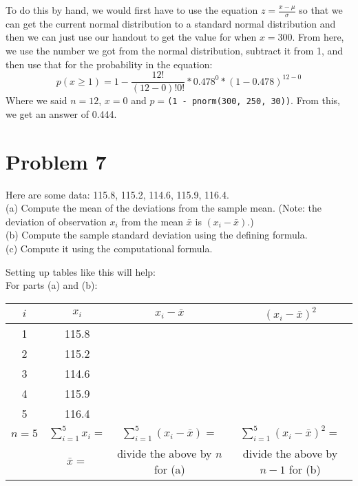 \documentclass{article}
\newcommand{\code}[1]{\texttt{#1}}
\begin{document}
	To do this by hand, we would first have to use the equation $z = \frac{x-\mu}{\sigma}$ so that we can get the current normal distribution to a standard normal distribution and then we can just use our handout to get the value for when $x = 300$. From here, we use the number we got from the normal distribution, subtract it from 1, and then use that for the probability in the equation:
	\begin{displaymath}
		p(x \ge 1) = 1 - \frac{12!}{(12-0)!0!}*0.478^0*(1-0.478)^{12-0}
	\end{displaymath}
	Where we said $n = 12$, $x = 0$ and $p=$\code{(1 - pnorm(300, 250, 30))}. From this, we get an answer of 0.444. %


\section*{Problem 7}

	Here are some data: 115.8, 115.2, 114.6, 115.9, 116.4. \\

	(a) Compute the mean of the deviations from the sample mean. (Note: the deviation of 
	observation $x_i$ from the mean $\bar{x}$ is $(x_i - \bar{x})$.) \\
	(b) Compute the sample standard deviation using the defining formula. \\
	(c) Compute it using the computational formula.
	
	Setting up tables like this will help: \\
	
	For parts (a) and (b):
	\begin{table}[!htb]
	\begin{tabular}{ | c | c | c | c | } \hline
		$i$ & $x_i$ & $x_i - \bar{x}$ & $(x_i - \bar{x})^2$ \\ \hline
		1 & 115.8 & & \\
		2 & 115.2 & & \\
		3 & 114.6 & & \\
		4 & 115.9 & & \\
		5 & 116.4 & & \\ \hline
		
		$n=5$ &
		$\sum_{i=1}^{5} x_i =$ &
		$\sum_{i=1}^{5}(x_i - \bar{x}) =$ &
		$ \sum_{i=1}^{5} (x_i - \bar{x})^2 =$ \\ 
		
		& $\bar{x} =$ & divide the above by $n$ for (a) & divide the above by $n-1$ for (b) \\ \hline
	\end{tabular}
	\end{table}
	
\end{document}
